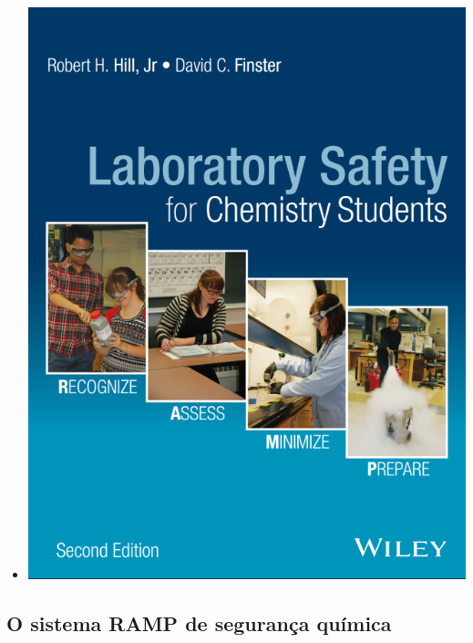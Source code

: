 \documentclass[
  letterpaper,
  DIV=11,
  numbers=noendperiod]{scrartcl}
\providecommand{\tightlist}{%
  \setlength{\itemsep}{0pt}\setlength{\parskip}{0pt}}\usepackage{longtable,booktabs,array}
\begin{document}
\begin{itemize}
\tightlist
\item
  \includegraphics[width=5.20833in,height=\textheight,keepaspectratio]{imagens/hill_e_finster.png}
\end{itemize}

\subsection{O sistema RAMP de segurança
química}\label{o-sistema-ramp-de-seguranuxe7a-quuxedmica}
\end{document}
